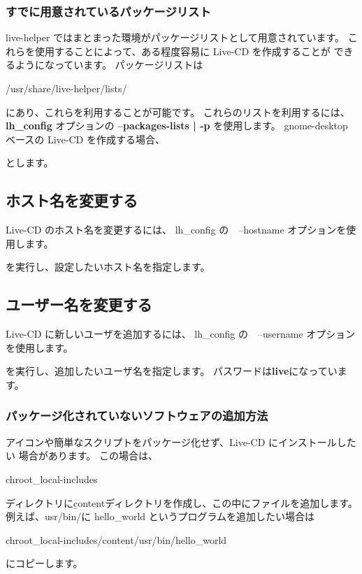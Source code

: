 \documentclass[mingoth,a4paper]{jsarticle}
\begin{document}
\subsubsection{すでに用意されているパッケージリスト}
live-helper ではまとまった環境がパッケージリストとして用意されています。
これらを使用することによって、ある程度容易に Live-CD を作成することが
できるようになっています。
パッケージリストは
\begin{commandline}
/usr/share/live-helper/lists/
\end{commandline}
にあり、これらを利用することが可能です。
これらのリストを利用するには、{\bf lh\_config} オプションの {\bf --packages-lists | -p} 
を使用します。
gnome-desktop ベースの Live-CD を作成する場合、
\begin{commandline}
\end{commandline}
とします。

\subsection{ホスト名を変更する}
Live-CD のホスト名を変更するには、
lh\_config の　--hostname オプションを使用します。
\begin{commandline}
\end{commandline}
を実行し、設定したいホスト名を指定します。

\subsection{ユーザー名を変更する}
Live-CD に新しいユーザを追加するには、
lh\_config の　--username オプションを使用します。
\begin{commandline}
\end{commandline}
を実行し、追加したいユーザ名を指定します。
パスワードは{\bf live}になっています。

\subsubsection{パッケージ化されていないソフトウェアの追加方法}
アイコンや簡単なスクリプトをパッケージ化せず、Live-CD にインストールしたい
場合があります。
この場合は、
\begin{commandline}
chroot_local-includes
\end{commandline}
ディレクトリに{\b content}ディレクトリを作成し、この中にファイルを追加します。
例えば、usr/bin/に hello\_world というプログラムを追加したい場合は
\begin{commandline}
chroot_local-includes/content/usr/bin/hello_world
\end{commandline}
にコピーします。
\end{document}
